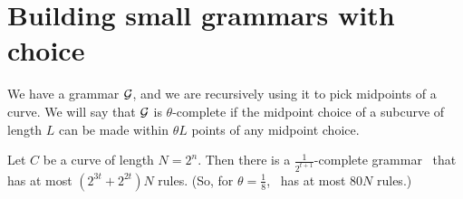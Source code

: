 \documentclass{article}
\begin{document}
  \eitem

\section{Building small grammars with choice}

We have a grammar ${\mathcal G}$, and we are recursively using it to pick
midpoints of a curve. We will say that ${\mathcal G}$ is $\theta$-complete if
the midpoint choice of a subcurve of length $L$ can be made within
$\theta L$ points of any midpoint choice.

\begin{thm}
Let $C$ be a curve of length $N = 2^n$. Then there is a
$\frac{1}{2^{t+1}}$-complete grammar \GGG\ that has at most
$(2^{3t} + 2^{2t}) N$ rules. (So, for $\theta=\frac{1}{8}$,
\GGG\ has at most $80 N$ rules.)
\end{thm}
\end{document}
